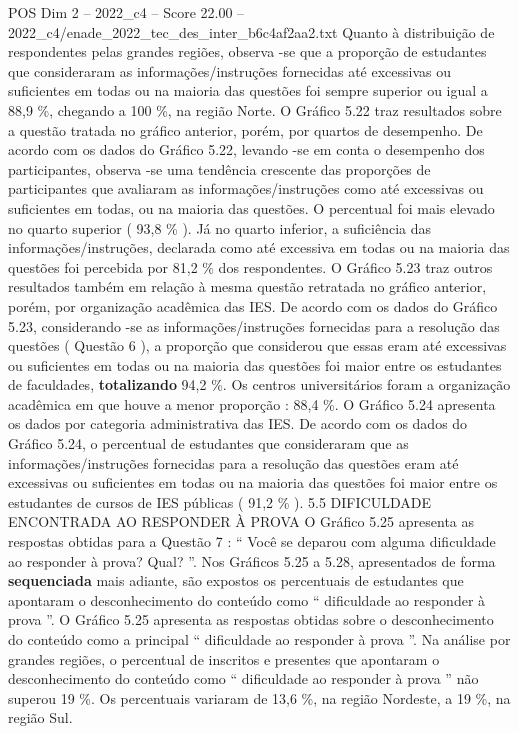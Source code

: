 \begin{textsample}{POS Dim 2 – 2022\_c4 – Score 22.00 – 2022\_c4/enade\_2022\_tec\_des\_inter\_b6c4af2aa2.txt}
Quanto à distribuição de respondentes pelas grandes regiões, observa -se que a proporção de estudantes que consideraram as informações/instruções fornecidas até excessivas ou suficientes em todas ou na maioria das questões foi sempre superior ou igual a 88,9 \%, chegando a 100 \%, na região Norte.
O Gráfico 5.22 traz resultados sobre a questão tratada no gráfico anterior, porém, por quartos de desempenho.
De acordo com os dados do Gráfico 5.22, levando -se em conta o desempenho dos participantes, observa -se uma tendência crescente das proporções de participantes que avaliaram as informações/instruções como até excessivas ou suficientes em todas, ou na maioria das questões.
O percentual foi mais elevado no quarto superior ( 93,8 \% ).
Já no quarto inferior, a suficiência das informações/instruções, declarada como até excessiva em todas ou na maioria das questões foi percebida por 81,2 \% dos respondentes.
O Gráfico 5.23 traz outros resultados também em relação à mesma questão retratada no gráfico anterior, porém, por organização acadêmica das IES.
De acordo com os dados do Gráfico 5.23, considerando -se as informações/instruções fornecidas para a resolução das questões ( Questão 6 ), a proporção que considerou que essas eram até excessivas ou suficientes em todas ou na maioria das questões foi maior entre os estudantes de faculdades, \textbf{totalizando} 94,2 \%.
Os centros universitários foram a organização acadêmica em que houve a menor proporção : 88,4 \%.
O Gráfico 5.24 apresenta os dados por categoria administrativa das IES.
De acordo com os dados do Gráfico 5.24, o percentual de estudantes que consideraram que as informações/instruções fornecidas para a resolução das questões eram até excessivas ou suficientes em todas ou na maioria das questões foi maior entre os estudantes de cursos de IES públicas ( 91,2 \% ). 5.5 DIFICULDADE ENCONTRADA AO RESPONDER À PROVA O Gráfico 5.25 apresenta as respostas obtidas para a Questão 7 : “ Você se deparou com alguma dificuldade ao responder à prova?
Qual? ”.
Nos Gráficos 5.25 a 5.28, apresentados de forma \textbf{sequenciada} mais adiante, são expostos os percentuais de estudantes que apontaram o desconhecimento do conteúdo como “ dificuldade ao responder à prova ”.
O Gráfico 5.25 apresenta as respostas obtidas sobre o desconhecimento do conteúdo como a principal “ dificuldade ao responder à prova ”.
Na análise por grandes regiões, o percentual de inscritos e presentes que apontaram o desconhecimento do conteúdo como “ dificuldade ao responder à prova ” não superou 19 \%.
Os percentuais variaram de 13,6 \%, na região Nordeste, a 19 \%, na região Sul.

\end{textsample}
